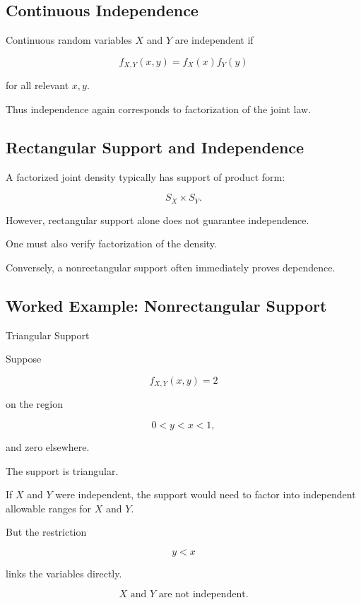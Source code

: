 \subsection{Continuous Independence}
\label{subsec:continuous-independence}

Continuous random variables \(X\) and \(Y\) are independent if

\[
\boxed{
f_{X,Y}(x,y)
=
f_X(x)f_Y(y)
}
\]

for all relevant \(x,y\).

Thus independence again corresponds to factorization of the joint law.

\subsection{Rectangular Support and Independence}
\label{subsec:rectangular-support-independence}

A factorized joint density typically has support of product form:

\[
\boxed{
S_X\times S_Y.
}
\]

However, rectangular support alone does not guarantee independence.

One must also verify factorization of the density.

Conversely, a nonrectangular support often immediately proves
dependence.

\subsection{Worked Example: Nonrectangular Support}
\label{subsec:worked-nonrectangular-support}

\begin{workedexamplebox}{Triangular Support}

Suppose

\[
f_{X,Y}(x,y)
=
2
\]

on the region

\[
0<y<x<1,
\]

and zero elsewhere.

The support is triangular.

If \(X\) and \(Y\) were independent, the support would need to factor
into independent allowable ranges for \(X\) and \(Y\).

But the restriction

\[
y<x
\]

links the variables directly.

\begin{answerbox}
\[
\boxed{
X\text{ and }Y\text{ are not independent}.
}
\]
\end{answerbox}

\end{workedexamplebox}

